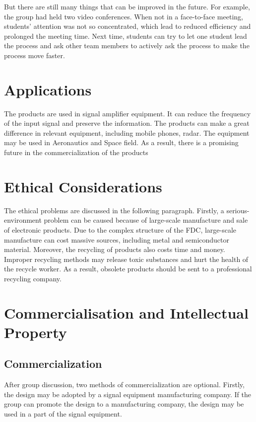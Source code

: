 \documentclass[12pt, a4paper]{report}
\begin{document}
But there are still many things that can be improved in the future. For example, the group had held two video conferences. When not in a face-to-face meeting, students' attention was not so concentrated, which lead to reduced efficiency and prolonged the meeting time. Next time, students can try to let one student lead the process and ask other team members to actively ask the process to make the process move faster.



\section{Applications}

The products are used in signal amplifier equipment. It can reduce the frequency of the input signal and preserve the information. The products can make a great difference in relevant equipment, including mobile phones, radar. The equipment may be used in Aeronautics and Space field. As a result, there is a promising future in the commercialization of the products

\section{Ethical Considerations}

The ethical problems are discussed in the following paragraph. Firstly, a serious-environment problem can be caused because of large-scale manufacture and sale of electronic products. Due to the complex structure of the FDC, large-scale manufacture can cost massive sources, including metal and semiconductor material. Moreover, the recycling of products also costs time and money. Improper recycling methods may release toxic substances and hurt the health of the recycle worker. As a result, obsolete products should be sent to a professional recycling company.

\section{Commercialisation and Intellectual Property}

\subsection{Commercialization}

After group discussion, two methods of commercialization are optional. Firstly, the design may be adopted by a signal equipment manufacturing company. If the group can promote the design to a manufacturing company, the design may be used in a part of the signal equipment. 
\end{document}
